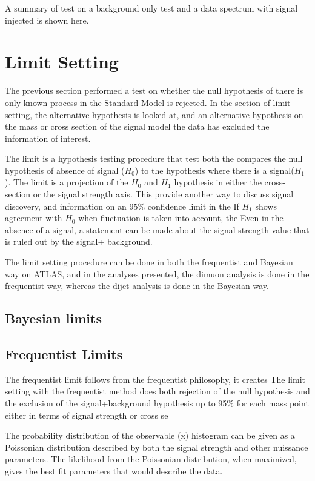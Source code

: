     A summary of test on a background only test and a data spectrum with signal injected is shown here.

    
\section{Limit Setting}

The previous section performed a test on whether the null hypothesis of there is only known process in the Standard Model is rejected. In the section of limit setting, the alternative hypothesis is looked at, and an alternative hypothesis on the mass or cross section of the signal model the data has excluded the information of interest. 

The limit is a hypothesis testing procedure that test both the 
compares the null hypothesis of absence of signal ($H_{0}$) to the hypothesis where there is a signal($H_{1}$). 
The limit is a projection of the $H_0$ and $H_1$ hypothesis in either the cross-section or the signal strength axis. This provide another way to discuss signal discovery, and information on an 95\% confidence limit in the If $H_1$ shows agreement with $H_{0}$ when fluctuation is taken into account, the 
Even in the absence of a signal, a statement can be made about the signal strength value that is ruled out by the signal+ background. 

The limit setting procedure can be done in both the frequentist and Bayesian way on ATLAS, and in the analyses presented, the dimuon analysis is done in the frequentist way, whereas the dijet analysis is done in the Bayesian way. 

\subsection{Bayesian limits}

\subsection{Frequentist Limits}
The frequentist limit follows from the frequentist philosophy, it creates 
The limit setting with the frequentist method does both rejection of the null hypothesis and the exclusion of the signal+background hypothesis up to 95\% for each mass point either in terms of signal strength or cross se

The probability distribution of the observable (x) histogram can be given as a Poissonian distribution described by both the signal strength and other nuissance parameters. The likelihood from the Poissonian distribution, when maximized, gives the best fit parameters that would describe the data. 

